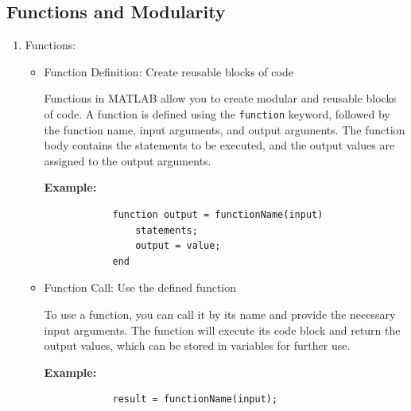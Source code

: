 \documentclass[
11pt, %
a4paper, %
oneside, %
headinclude,footinclude, %
BCOR5mm, %
]{scrartcl}
\begin{document}
\subsection{Functions and Modularity}
\begin{enumerate}
	\item Functions:
	\begin{itemize}
		\item Function Definition: Create reusable blocks of code
		
		Functions in MATLAB allow you to create modular and reusable blocks of code. A function is defined using the \texttt{function} keyword, followed by the function name, input arguments, and output arguments. The function body contains the statements to be executed, and the output values are assigned to the output arguments.
		
		\textbf{Example:}
		\begin{verbatim}
			function output = functionName(input)
			    statements;
			    output = value;
			end
		\end{verbatim}
		
		\item Function Call: Use the defined function
		
		To use a function, you can call it by its name and provide the necessary input arguments. The function will execute its code block and return the output values, which can be stored in variables for further use.
		
		\textbf{Example:}
		\begin{verbatim}
			result = functionName(input);
		\end{verbatim}
	\end{itemize}
\end{enumerate}
\end{document}
